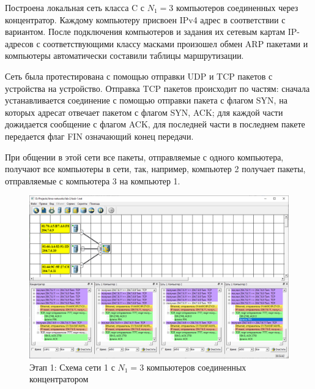 

\newpage
{}


Построена локальная сеть класса C с $N_1=3$ компьютеров соединенных через концентратор. Каждому компьютеру присвоен IPv4 адрес в соответствии с вариантом. После подключения компьютеров и задания их сетевым картам IP-адресов с соответствующими классу масками произошел обмен ARP пакетами и компьютеры автоматически составили таблицы маршрутизации.

Сеть была протестирована с помощью отправки UDP и TCP пакетов с устройства на устройство. Отправка TCP пакетов происходит по частям: сначала устанавливается соединение с помощью отправки пакета с флагом SYN, на которых адресат отвечает пакетом с флагом SYN, ACK; для каждой части дожидается сообщение с флагом ACK, для последней части в последнем пакете передается флаг FIN означающий конец передачи. 

При общении в этой сети все пакеты, отправляемые с одного компьютера, получают все компьютеры в сети, так, например, компьютер 2 получает пакеты, отправляемые с компьютера 3 на компьютер 1.

\begin{figure}[H]
    \centering
    \includegraphics[width=1\linewidth]{res/task-1.png}
    \caption{Этап 1: Схема сети 1 с $N_1=3$ компьютеров соединенных концентратором}
    \label{fig:task-1}
\end{figure}

